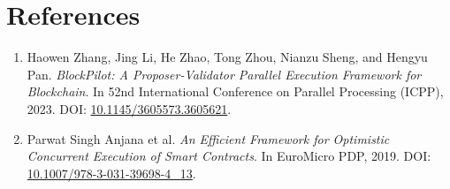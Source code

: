 \documentclass[12pt]{article}
\begin{document}
\section{References}

\begin{enumerate}
    \item Haowen Zhang, Jing Li, He Zhao, Tong Zhou, Nianzu Sheng, and Hengyu Pan. \textit{BlockPilot: A Proposer-Validator Parallel Execution Framework for Blockchain}. In 52nd International Conference on Parallel Processing (ICPP), 2023. DOI: \href{https://doi.org/10.1145/3605573.3605621}{10.1145/3605573.3605621}.
    \item Parwat Singh Anjana et al. \textit{An Efficient Framework for Optimistic Concurrent Execution of Smart Contracts}. In EuroMicro PDP, 2019. DOI: \href{https://doi.org/10.1007/978-3-031-39698-4_13}{10.1007/978-3-031-39698-4\_13}.
\end{enumerate}
\end{document}
